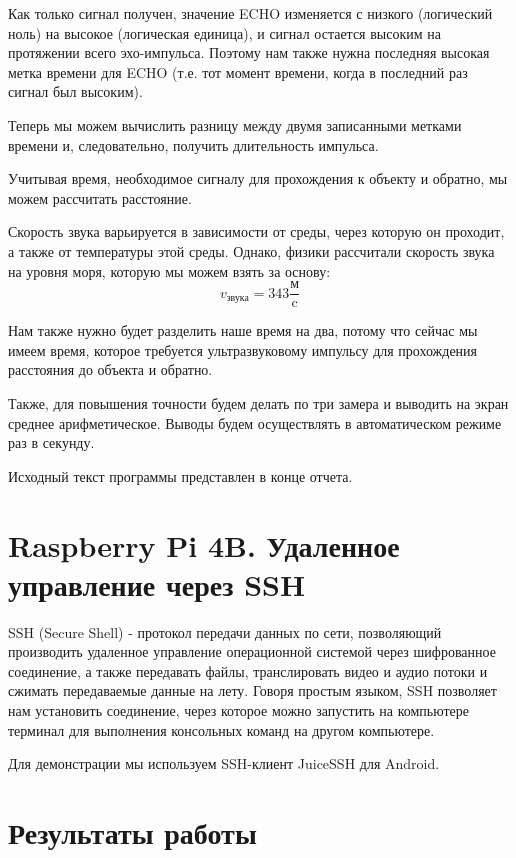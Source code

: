 \documentclass[a4paper, 14pt]{article}
\begin{document}
Как только сигнал получен, значение ECHO изменяется с низкого (логический ноль) на высокое (логическая единица), и сигнал остается высоким на протяжении всего эхо-импульса. Поэтому нам также нужна последняя высокая метка времени для ECHO (т.е. тот момент времени, когда в последний раз сигнал был высоким).

Теперь мы можем вычислить разницу между двумя записанными метками времени и, следовательно, получить длительность импульса.

Учитывая время, необходимое сигналу для прохождения к объекту и обратно, мы можем рассчитать расстояние.

Скорость звука варьируется в зависимости от среды, через которую он проходит, а также от температуры этой среды. Однако, физики рассчитали скорость звука на уровня моря, которую мы можем взять за основу:
$$v_{\text{звука}} = 343 \frac{\text{м}}{\text{c}}$$

Нам также нужно будет разделить наше время на два, потому что сейчас мы имеем время, которое требуется ультразвуковому импульсу для прохождения расстояния до объекта и обратно.

Также, для повышения точности будем делать по три замера и выводить на экран среднее арифметическое. Выводы будем осуществлять в автоматическом режиме раз в секунду.

Исходный текст программы представлен в конце отчета.

\newpage
\section{Raspberry Pi 4B. Удаленное управление через SSH}

SSH (Secure Shell) - протокол передачи данных по сети, позволяющий производить удаленное управление операционной системой через шифрованное соединение, а также передавать файлы, транслировать видео и аудио потоки и сжимать передаваемые данные на лету. Говоря простым языком, SSH позволяет нам установить соединение, через которое можно запустить на компьютере терминал для выполнения консольных команд на другом компьютере.

Для демонстрации мы используем SSH-клиент JuiceSSH для Android.

\newpage
\section{Результаты работы}
\end{document}
